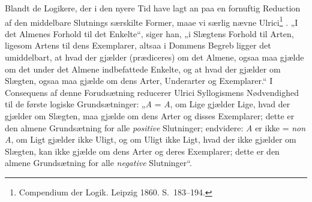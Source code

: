 \documentclass[12pt]{book}
\newcommand{\opage}[1]{\marginnote{\footnotesize\textit{[#1]}}}
\begin{document}
Blandt de Logikere, der i den nyere Tid have lagt an paa en fornuftig Reduction af den middelbare Slutnings særskilte Former, maae vi særlig nævne Ulrici\footnote{Compendium der Logik. Leipzig 1860. S.~183--194.}%
. „I det Almenes Forhold til det Enkelte“, siger han, „i Slægtens Forhold til Arten, ligesom Artens til dens Exemplarer, altsaa i Dommens Begreb ligger det umiddelbart, at hvad der gjælder (prædiceres) om det Almene, ogsaa maa gjælde om det under det Almene indbefattede Enkelte, og at hvad der gjælder om Slægten, ogsaa maa gjælde om dens Arter, Underarter og Exemplarer.“ I Consequens af denne Forudsætning reducerer Ulrici Syllogismens Nødvendighed til de første logiske Grundsætninger: „\textit{A} = \textit{A}, om Lige gjælder Lige, hvad der
\opage{320}gjælder om Slægten, maa gjælde om dens Arter og disses Exemplarer; dette er den almene Grundsætning for alle \emph{positive} Slutninger; endvidere: \textit{A} er ikke = \textit{non A}, om Ligt gjælder ikke Uligt, og om Uligt ikke Ligt, hvad der ikke gjælder om Slægten, kan ikke gjælde om dens Arter og deres Exemplarer; dette er den almene Grundsætning for alle \emph{negative} Slutninger“.
\end{document}
